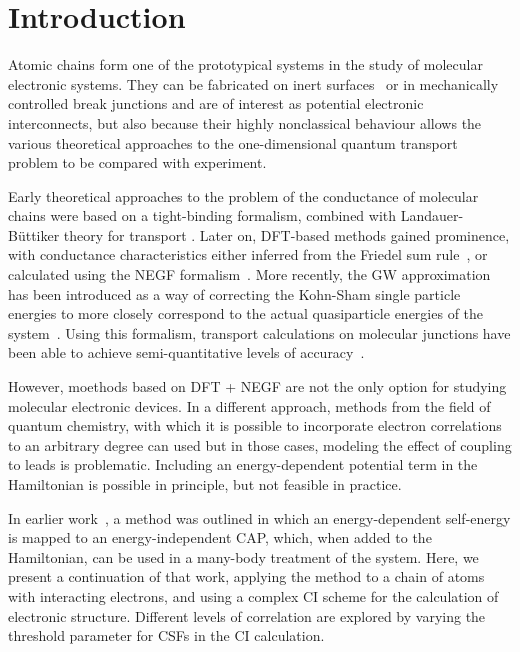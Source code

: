\section{Introduction}

Atomic chains form one of the prototypical systems in the study of molecular
electronic systems. They can be fabricated on inert
surfaces~\cite{nilius2002science, segovia1999nature} or in mechanically
controlled break junctions \cite{vanruitenbeek1998mcbj} and are of interest as
potential electronic interconnects, but also because their highly nonclassical
behaviour allows the various theoretical approaches to the one-dimensional
quantum transport problem to be compared with experiment.

Early theoretical approaches to the problem of the conductance of molecular
chains were based on a tight-binding formalism, combined with
Landauer-B\"uttiker theory for transport
\cite{emberlykirczenow1999standingwave, emberlykirczenow2000molecularwire}.
Later on, \ac{DFT}-based methods gained prominence, with conductance
characteristics either inferred from the Friedel sum
rule~\cite{sim2001sodiumwire}, or calculated using the \ac{NEGF}
\cite{meirwingreen1992negf} formalism~\cite{leepuska2004monovalent,
thygesen2003aluminium}. More recently, the GW approximation~\cite{hedin1965gw}
has been introduced as a way of correcting the Kohn-Sham single particle
energies to more closely correspond to the actual quasiparticle energies of the
system~\cite{thygesen_rubio, thygesenrubio2010corr}. Using this formalism,
transport calculations on molecular junctions have been able to achieve
semi-quantitative levels of accuracy~\cite{strange2011benzene,
strange2011alkane}.

However, moethods based on \ac{DFT} + \ac{NEGF} are not the only option for
studying molecular electronic devices. In a different approach, methods from
the field of quantum chemistry, with which it is possible to incorporate
electron correlations to an arbitrary degree can  used \cite{vici2004} but in
those cases, modeling the effect of coupling to leads is problematic. Including
an energy-dependent potential term in the Hamiltonian is possible in principle,
but not feasible in practice.

In earlier work~\cite{henderson}, a method was outlined in which an
energy-dependent self-energy is mapped to an energy-independent
\ac{CAP}, which, when added to the Hamiltonian, can be used
in a many-body treatment of the system. Here, we present a continuation of that
work, applying the method to a chain of atoms with interacting electrons, and
using a complex \ac{CI} scheme for the calculation of electronic structure.
Different levels of correlation are explored by varying the threshold
parameter for \acp{CSF} in the \ac{CI} calculation.

